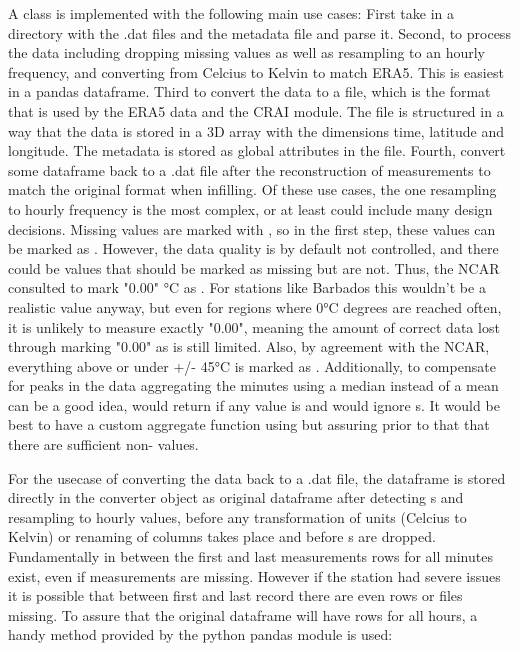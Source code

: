 A class  is implemented with the following main use cases:
First take in a directory with the .dat files and the metadata file and parse it. Second, to process the data including dropping missing values as well as resampling to an hourly frequency, and converting from Celcius to Kelvin to match ERA5. This is easiest in a pandas dataframe. Third to convert the data to a  file, which is the format that is used by the ERA5 data and the CRAI module. The  file is structured in a way that the data is stored in a 3D array with the dimensions time, latitude and longitude. The metadata is stored as global attributes in the  file. Fourth, convert some dataframe back to a .dat file after the reconstruction of measurements to match the original format when infilling. Of these use cases, the one resampling to hourly frequency is the most complex, or at least could include many design decisions. Missing values are marked with , so in the first step, these values can be marked as . However, the data quality is by default not controlled, and there could be values that should be marked as missing but are not. Thus, the NCAR consulted to mark "0.00" °C as . For stations like Barbados this wouldn't be a realistic value anyway, but even for regions where 0°C degrees are reached often, it is unlikely to measure exactly "0.00", meaning the amount of correct data lost through marking "0.00" as  is still limited. Also, by agreement with the NCAR, everything above or under +/- 45°C is marked as . Additionally, to compensate for peaks in the data aggregating the minutes using a median instead of a mean can be a good idea,  would return  if any value is  and  would ignore s. It would be best to have a custom aggregate function using  but assuring prior to that that there are sufficient non- values.

For the usecase of converting the data back to a .dat file, the dataframe is stored directly in the converter object as original dataframe after detecting s and resampling to hourly values, before any transformation of units (Celcius to Kelvin) or renaming of columns takes place and before s are dropped. Fundamentally in between the first and last measurements rows for all minutes exist, even if measurements are missing. However if the station had severe issues it is possible that between first and last record there are even rows or files missing. To assure that the original dataframe will have rows for all hours, a handy method provided by the python pandas module is used:

